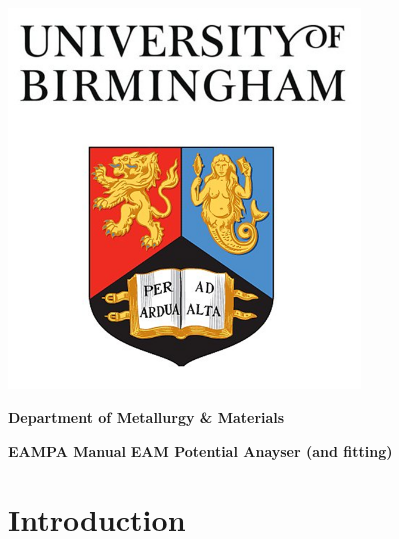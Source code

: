 \documentclass[12pt,twoside]{manual}
\begin{document}

\begin{titlepage}
  \begin{center}
    \centerline{\includegraphics[width=0.7\textwidth]{img/coverart}}


    \textbf{Department of Metallurgy \& Materials}

    \vspace*{2.0cm}
    \Large{}
    \textbf{EAMPA Manual}
    \textbf{EAM Potential Anayser (and fitting)}
    \vspace{0.8cm}
    \normalsize{}

  \end{center}
\end{titlepage}



\tableofcontents









\chapter{Introduction}
\end{document}
